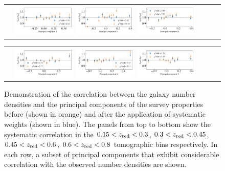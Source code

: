 \documentclass[fleqn,usenatbib,useAMS]{mnras}
\begin{document}
\begin{figure}
\begin{tabular}{ccc}
\includegraphics[width=0.3\textwidth]{figures_tmp/sys/result_pca_ngal_0_45_1_poly_1.png}
\includegraphics[width=0.3\textwidth]{figures_tmp/sys/result_pca_ngal_0_45_5_poly_1.png}
\includegraphics[width=0.3\textwidth]{figures_tmp/sys/result_pca_ngal_0_45_6_poly_1.png}
\end{tabular}

\begin{tabular}{ccc}
\includegraphics[width=0.3\textwidth]{figures_tmp/sys/result_pca_ngal_0_6_0_poly_1.png}
\includegraphics[width=0.3\textwidth]{figures_tmp/sys/result_pca_ngal_0_6_4_poly_1.png}
\includegraphics[width=0.3\textwidth]{figures_tmp/sys/result_pca_ngal_0_6_5_poly_1.png}
\end{tabular}

\caption{\label{fig:sys_correlation} Demonstration of the correlation between the galaxy number densities and the principal components of the survey properties before (shown in orange) and after the application of systematic weights (shown in blue). The panels from top to bottom show the systematic correlation in the $0.15<z_{\rm red}<0.3$, $0.3<z_{\rm red}<0.45$, $0.45<z_{\rm red}<0.6$, $0.6<z_{\rm red}<0.8$ tomographic bins respectively. In each row, a subset of principal components that exhibit considerable correlation with the observed number densities are shown.} 
\end{figure}
\end{document}
